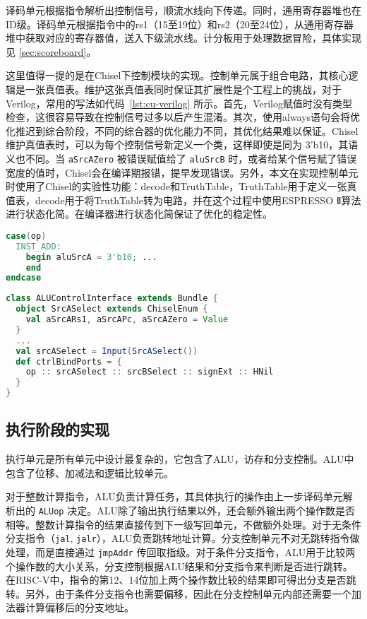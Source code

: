 译码单元根据指令解析出控制信号，顺流水线向下传递。同时，通用寄存器堆也在ID级。译码单元根据指令中的rs1（15至19位）和rs2（20至24位），从通用寄存器堆中获取对应的寄存器值，送入下级流水线。计分板用于处理数据冒险，具体实现见 \ref{sec:scoreboard}。

这里值得一提的是在Chisel下控制模块的实现。控制单元属于组合电路，其核心逻辑是一张真值表。维护这张真值表同时保证其扩展性是个工程上的挑战，对于Verilog，常用的写法如代码~\ref{lst:cu-verilog} 所示。首先，Verilog赋值时没有类型检查，这很容易导致在控制信号过多以后产生混淆。其次，使用always语句会将优化推迟到综合阶段，不同的综合器的优化能力不同，其优化结果难以保证。Chisel维护真值表时，可以为每个控制信号新定义一个类，这样即使是同为 3'b10，其语义也不同。当 \lstinline{aSrcAZero} 被错误赋值给了 \lstinline{aluSrcB} 时，或者给某个信号赋了错误宽度的值时，Chisel会在编译期报错，提早发现错误。另外，本文在实现控制单元时使用了Chisel的实验性功能：decode和TruthTable，TruthTable用于定义一张真值表，decode用于将TruthTable转为电路，并在这个过程中使用ESPRESSO Ⅱ\cite{braytonEspressoIIMinimizationLoop1984}算法进行状态化简。在编译器进行状态化简保证了优化的稳定性。

\begin{lstlisting}[language=verilog,captionpos=b,caption={Verilog实现控制单元},label={lst:cu-verilog}]
case(op)
  INST_ADD:
    begin aluSrcA = 3'b10; ...
    end
endcase
\end{lstlisting}

\begin{lstlisting}[language=scala,captionpos=b,caption={Chisel实现控制单元},label={lst:cu-verilog}]
class ALUControlInterface extends Bundle {
  object SrcASelect extends ChiselEnum {
    val aSrcARs1, aSrcAPc, aSrcAZero = Value
  }
  ...
  val srcASelect = Input(SrcASelect())
  def ctrlBindPorts = {
    op :: srcASelect :: srcBSelect :: signExt :: HNil
  }
}
\end{lstlisting}

\subsection{执行阶段的实现}


执行单元是所有单元中设计最复杂的，它包含了ALU，访存和分支控制。ALU中包含了位移、加减法和逻辑比较单元。

对于整数计算指令，ALU负责计算任务，其具体执行的操作由上一步译码单元解析出的 \lstinline{ALUop} 决定。ALU除了输出执行结果以外，还会额外输出两个操作数是否相等。整数计算指令的结果直接传到下一级写回单元，不做额外处理。对于无条件分支指令（\lstinline{jal}, \lstinline{jalr}），ALU负责跳转地址计算。分支控制单元不对无跳转指令做处理，而是直接通过 \lstinline{jmpAddr} 传回取指级。对于条件分支指令，ALU用于比较两个操作数的大小关系，分支控制根据ALU结果和分支指令来判断是否进行跳转。在RISC-V中，指令的第12、14位加上两个操作数比较的结果即可得出分支是否跳转。另外，由于条件分支指令也需要偏移，因此在分支控制单元内部还需要一个加法器计算偏移后的分支地址。

